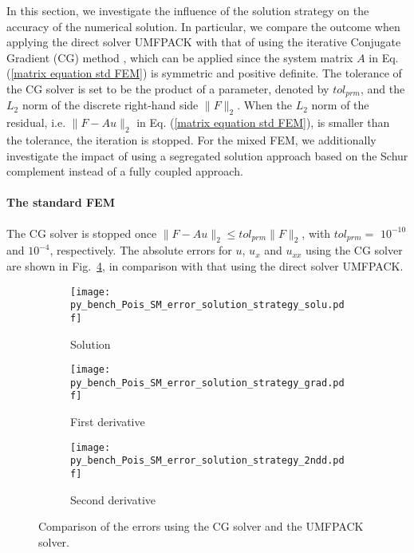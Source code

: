\documentclass[review,3p]{elsarticle}
\begin{document}
In this section, we investigate the influence of the solution strategy on the accuracy of the numerical solution. In particular, we compare the outcome when applying the direct solver UMFPACK with that of using the iterative Conjugate Gradient (CG) method \cite{ginsburg1963cg}, which can be applied since the system matrix $A$ in Eq. (\ref{matrix equation std FEM}) is symmetric and positive definite. The tolerance of the CG solver is set to be the product of a parameter, denoted by $tol_{prm}$, and the $L_2$ norm of the discrete right-hand side $\|F\|_2$.
When the $L_2$ norm of the residual, i.e. $\|F-Au\|_2$ in Eq. (\ref{matrix equation std FEM}), is smaller than the tolerance, the iteration is stopped.
For the mixed FEM, we additionally investigate the impact of using a segregated solution approach based on the Schur complement instead of a fully coupled approach.

\paragraph{The standard FEM}

The CG solver is stopped once $\|F-Au\|_2 \leqslant tol_{prm}\|F\|_2$, with $tol_{prm}=$ $10^{-10}$ and $10^{-4}$, respectively. 
The absolute errors for $u$, $u_{x}$ and $u_{xx}$ using the CG solver are shown in Fig.~\ref{py_bench_Pois_SM_error_solution_strategy}, in comparison with that using the direct solver UMFPACK. 

\begin{figure}[!ht]
    \begin{subfigure}{5.5cm}
        \texttt{[image: py\_bench\_Pois\_SM\_error\_solution\_strategy\_solu.pdf]}
        \caption{Solution}
        \label{py_bench_Pois_SM_error_solution_strategy_solu}
    \end{subfigure}
    \hspace{-0.2cm}
    \begin{subfigure}{5.5cm}
        \texttt{[image: py\_bench\_Pois\_SM\_error\_solution\_strategy\_grad.pdf]}
        \caption{First derivative}
        \label{py_bench_Pois_SM_error_solution_strategy_grad}
    \end{subfigure}
    \hspace{-0.2cm}
    \begin{subfigure}{5.5cm}
        \texttt{[image: py\_bench\_Pois\_SM\_error\_solution\_strategy\_2ndd.pdf]}
        \caption{Second derivative}
        \label{py_bench_Pois_SM_error_solution_strategy_2ndd}
    \end{subfigure}
\caption{Comparison of the errors using the CG solver and the UMFPACK solver.}
\label{py_bench_Pois_SM_error_solution_strategy}
\end{figure}
\end{document}
